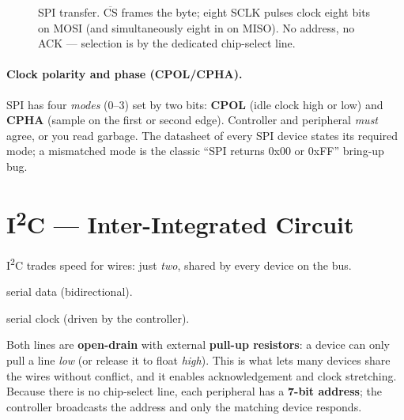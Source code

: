 \documentclass[11pt,a4paper,oneside]{book}
\begin{document}
\begin{figure}[h]
\centering
{}
\caption{SPI transfer. $\overline{\text{CS}}$ frames the byte; eight SCLK pulses
clock eight bits on MOSI (and simultaneously eight in on MISO). No address, no
ACK --- selection is by the dedicated chip-select line.}
\label{fig:spi-timing}
\end{figure}

\paragraph{Clock polarity and phase (CPOL/CPHA).} SPI has four \emph{modes} (0--3)
set by two bits: \textbf{CPOL} (idle clock high or low) and \textbf{CPHA} (sample
on the first or second edge). Controller and peripheral \emph{must} agree, or you
read garbage. The datasheet of every SPI device states its required mode; a
mismatched mode is the classic ``SPI returns 0x00 or 0xFF'' bring-up bug.

\section{I\textsuperscript{2}C --- Inter-Integrated Circuit}
I\textsuperscript{2}C trades speed for wires: just \emph{two}, shared by every
device on the bus.
\begin{description}[leftmargin=1.8cm,style=nextline]
  \item[SDA] serial data (bidirectional).
  \item[SCL] serial clock (driven by the controller).
\end{description}
Both lines are \textbf{open-drain} with external \textbf{pull-up resistors}: a
device can only pull a line \emph{low} (or release it to float \emph{high}). This
is what lets many devices share the wires without conflict, and it enables
acknowledgement and clock stretching. Because there is no chip-select line, each
peripheral has a \textbf{7-bit address}; the controller broadcasts the address and
only the matching device responds.
\end{document}
